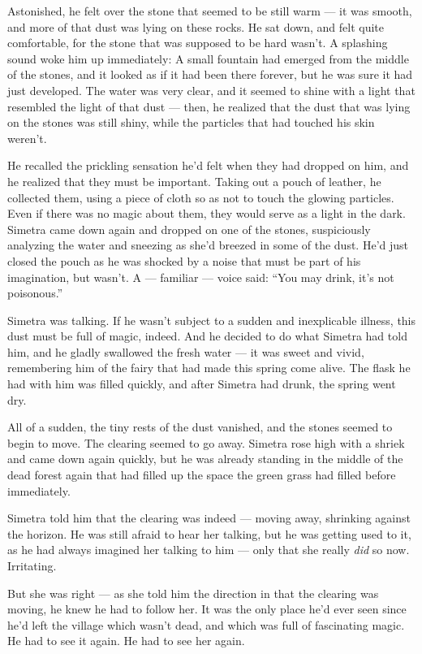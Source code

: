 Astonished, he felt over the stone that seemed to be still warm --- it was smooth, and more of that dust was lying on these rocks. He sat down, and felt quite comfortable, for the stone that was supposed to be hard wasn't. 
A splashing sound woke him up immediately: A small fountain had emerged from the middle of the stones, and it looked as if it had been there forever, but he was sure it had just developed. 
The water was very clear, and it seemed to shine with a light that resembled the light of that dust --- then, he realized that the dust that was lying on the stones was still shiny, while the particles that had touched his skin weren't.

He recalled the prickling sensation he'd felt when they had dropped on him, and he realized that they must be important. Taking out a pouch of leather, he collected them, using a piece of cloth so as not to touch the glowing particles. Even if there was no magic about them, they would serve as a light in the dark. 
Simetra came down again and dropped on one of the stones, suspiciously analyzing the water and sneezing as she'd breezed in some of the dust. 
He'd just closed the pouch as he was shocked by a noise that must be part of his imagination, but wasn't. A --- familiar --- voice said: \enquote{You may drink, it's not poisonous.}

Simetra was talking.
If he wasn't subject to a sudden and inexplicable illness, this dust must be full of magic, indeed. 
And he decided to do what Simetra had told him, and he gladly swallowed the fresh water --- it was sweet and vivid, remembering him of the fairy that had made this spring come alive. The flask he had with him was filled quickly, and after Simetra had drunk, the spring went dry.

All of a sudden, the tiny rests of the dust vanished, and the stones seemed to begin to move. The clearing seemed to go away. 
Simetra rose high with a shriek and came down again quickly, but he was already standing in the middle of the dead forest again that had filled up the space the green grass had filled before immediately.

Simetra told him that the clearing was indeed --- moving away, shrinking against the horizon.
He was still afraid to hear her talking, but he was getting used to it, as he had always imagined her talking to him --- only that she really \emph{did} so now. Irritating.

But she was right --- as she told him the direction in that the clearing was moving, he knew he had to follow her. It was the only place he'd ever seen since he'd left the village which wasn't dead, and which was full of fascinating magic. 
He had to see it again. 
He had to see her again.

